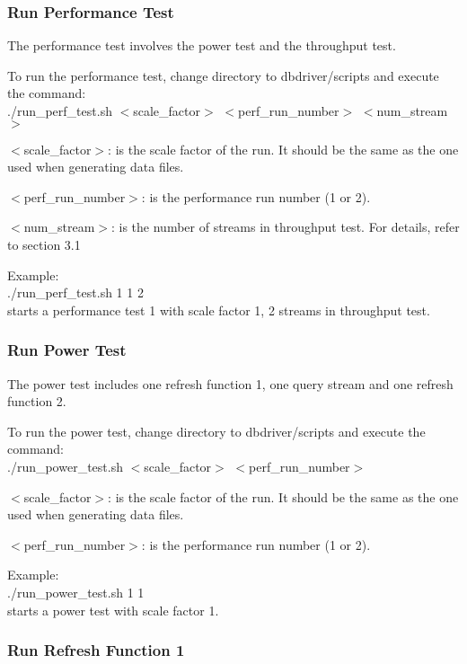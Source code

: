 \documentclass{article}
\begin{document}
\subsubsection{Run Performance Test}

\noindent
The performance test involves the power test and the throughput test.

\noindent
To run the performance test, change directory to dbdriver/scripts and
execute the command: \\
\indent ./run\_perf\_test.sh  $<$scale\_factor$>$ $<$perf\_run\_number$>$ $<$num\_stream$>$

\noindent
$<$scale\_factor$>$: is the scale factor of the run.  It should be the
same as the one used when generating data files.

\noindent
$<$perf\_run\_number$>$: is the performance run number (1 or 2).  

\noindent
$<$num\_stream$>$: is the number of streams in throughput test.  For
details, refer to section 3.1

Example: \\
\indent ./run\_perf\_test.sh 1 1 2 \\
\indent starts a performance test 1 with scale factor 1, 2 streams in throughput test.  

\subsubsection{Run Power Test}

\noindent
The power test includes one refresh function 1, one query stream and
one refresh function 2. 

\noindent
To run the power test, change directory to dbdriver/scripts and
execute the command: \\
\indent ./run\_power\_test.sh  $<$scale\_factor$>$ $<$perf\_run\_number$>$ 

\noindent
$<$scale\_factor$>$: is the scale factor of the run.  It should be the same
as the one used when generating data files.

\noindent
$<$perf\_run\_number$>$: is the performance run number (1 or 2).  

\noindent
Example: \\
\indent ./run\_power\_test.sh 1 1 \\
\indent starts a power test  with scale factor 1.  

\subsubsection{Run Refresh Function 1}
\end{document}
